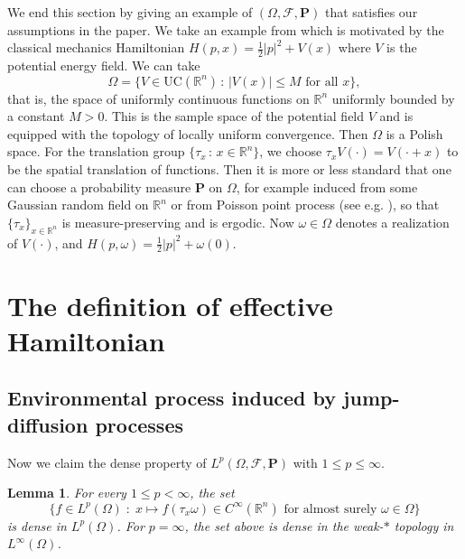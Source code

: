 \documentclass[11pt,reqno]{amsart}
\newtheorem{lem}[thm]{Lemma}
\theoremstyle{definition}
\theoremstyle{remark}
\numberwithin{equation}{section}
\newcommand{\R}{{\mathbb{R}}}
\newcommand{\scrF}{\mathscr{F}}
\begin{document}
We end this section by giving an example of $(\Omega,\scrF,\mathbf{P})$ that satisfies our assumptions in the paper. We take an example from \cite{ATY15} which is motivated by the classical mechanics Hamiltonian $H(p,x)=\frac12|p|^2 + V(x)$ where $V$ is the potential energy field. We can take 
\begin{equation*}
\Omega = \{V\in \mathrm{UC}(\R^n)\,:\, |V(x)|\le M \text{ for all $x$}\},
\end{equation*}
that is, the space of uniformly continuous functions on $\R^n$ uniformly bounded by a constant $M>0$. This is the sample space of the potential field $V$ and is equipped with the topology of locally uniform convergence. Then $\Omega$ is a Polish space. For the translation group $\{\tau_x \,:\, x\in \R^n\}$, we choose $\tau_x V(\cdot) = V(\cdot+x)$ to be the spatial translation of functions. Then it is more or less standard that one can choose a probability measure $\mathbf{P}$ on $\Omega$, for example induced from some Gaussian random field on $\R^n$ or from Poisson point process (see e.g. \cite{S98, GHV2018}), so that $\{\tau_x\}_{x\in \R^n}$ is measure-preserving and is ergodic. Now $\omega\in \Omega$ denotes a realization of $V(\cdot)$, and $H(p,\omega) =\frac12|p|^2+\omega(0)$.


\section{The definition of effective Hamiltonian}
\label{sec:envpro}

\subsection{Environmental process induced by jump-diffusion processes}

Now we claim the dense property of $L^{p}(\Omega,\mathscr{F},\mathbf{P})$ with $1 \leq p \leq \infty$.

\begin{lem}\label{Mollify}
For every $1\leq  p < \infty$, the set 
\begin{equation*}
    \{f\in L^{p}(\Omega) \;:\; x \mapsto f(\tau_{x}\omega) \in C^{\infty}(\mathbb{R}^n) \text{ for almost surely } \omega \in \Omega\}
\end{equation*}
is dense in $L^{p}(\Omega)$. For $p=\infty$, the set above is dense in the weak-$*$ topology in $L^\infty(\Omega)$.
\end{lem}
\end{document}
